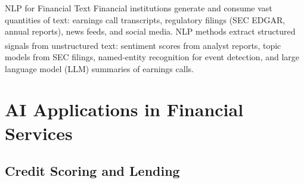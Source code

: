 \begin{v3topic}{NLP for Financial Text}
    Financial institutions generate and consume vast quantities of text: earnings call transcripts, regulatory filings (SEC EDGAR, annual reports), news feeds, and social media.
    NLP methods extract structured signals from unstructured text\textsuperscript{\cite[][pp.~440--441]{jansenMachineLearningAlgorithmic2020}}: sentiment scores from analyst reports, topic models from SEC filings, named-entity recognition for event detection, and large language model (LLM) summaries of earnings calls.

\end{v3topic}

\section{AI Applications in Financial Services}

\subsection{Credit Scoring and Lending}


